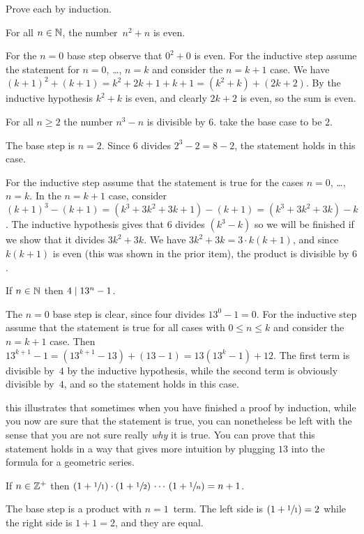 \documentclass{test}  %
\begin{document}
\begin{problem}
Prove each by induction.
\begin{exes}
\begin{exercise}
  For all $n\in\mathbb{N}$, the number~$n^2+n$ is even.
\end{exercise}
\begin{answer}
  For the $n=0$ base step observe that $0^2+0$ is even.
  For the inductive step assume the statement for $n=0$, \ldots, $n=k$
  and consider the $n=k+1$ case.
  We have $(k+1)^2+(k+1)=k^2+2k+1+k+1=(k^2+k)+(2k+2)$. 
  By the inductive hypothesis $k^2+k$ is even, and clearly $2k+2$ is even, 
  so the sum is even.
\end{answer}
\begin{exercise} 
  For all $n\geq 2$ the number $n^3-n$ is divisible by $6$.
  \hint take the base case to be $2$.
\end{exercise}
\begin{answer}
  The base step is $n=2$.
  Since $6$ divides $2^3-2=8-2$, the statement holds in this case.

  For the inductive step assume that the statement is true for 
  the cases $n=0$, \ldots, $n=k$.
  In the $n=k+1$ case, consider 
  $(k+1)^3-(k+1)=(k^3+3k^2+3k+1)-(k+1)=(k^3+3k^2+3k)-k$.
  The inductive hypothesis gives that $6$ divides $(k^3-k)$ so we will
  be finished if we show that it divides  $3k^2+3k$.
  We have $3k^2+3k=3\cdot k(k+1)$, and since
  $k(k+1)$ is even (this was shown in the prior item),
  the product is divisible by $6$.  
\end{answer}
\begin{exercise} 
  If $n\in\mathbb{N}$ then $4\mid 13^n-1$.
\end{exercise}
\begin{answer}
  The $n=0$ base step is clear, since four divides $13^0-1=0$.
  For the inductive step assume that the statement is true for all cases 
  with $0\leq n\leq k$ and consider the $n=k+1$ case.
  Then $13^{k+1}-1=(13^{k+1}-13)+(13-1)=13(13^k-1)+12$.
  The first term is divisible by~$4$ by the inductive hypothesis, while the
  second term is obviously divisible by~$4$, and so the statement holds in 
  this case.

  \remark
  this illustrates that 
  sometimes when you have finished a proof by induction, 
  while you now are sure that the statement is true, 
  you can nonetheless be left with the sense
  that you are not sure really \emph{why} it is true.
  You can prove that this statement holds in a 
  way that gives more intuition by plugging $13$ into the formula for a
  geometric series. 
\end{answer}
\begin{exercise} 
    If $n\in\mathbb{Z}^+$ then
    $(1+\sfrac{1}{1})\cdot(1+\sfrac{1}{2})\,\cdots\,(1+\sfrac{1}{n})=n+1$.
\end{exercise}
\begin{answer}
  The base step is a product with $n=1$~term.
  The left side is $(1+\sfrac{1}{1})=2$ while the right side is $1+1=2$,
  and they are equal.


\end{answer}
\end{exes}
\end{problem}
\end{document}
